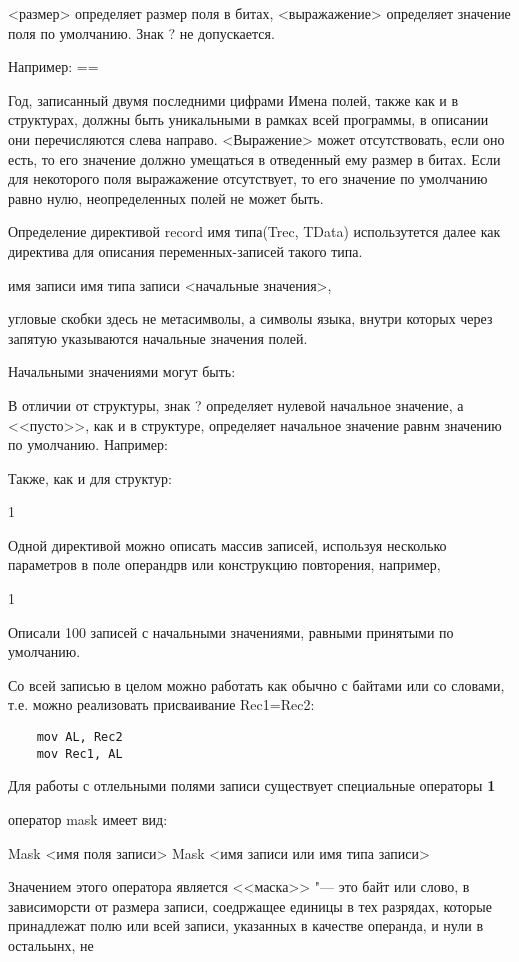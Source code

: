 <размер> определяет размер поля в битах, <выражажение> определяет значение поля по умолчанию. Знак ? не допускается.

Например:
==

Год, записанный двумя последними цифрами
Имена полей, также как и в структурах, должны быть уникальными в рамках всей программы, в описании они перечисляются слева направо. <Выражение> может отсутствовать, если оно есть, то его значение должно умещаться в отведенный ему размер в битах. Если для некоторого поля выражажение отсутствует, то его значение по умолчанию равно нулю, неопределенных полей не может быть.

Определение директивой record имя типа(Trec, TData) использутется далее как директива для описания переменных-записей такого типа.
\begin{center}
    имя записи имя типа записи <начальные значения>,
\end{center}
угловые скобки здесь не метасимволы, а символы языка, внутри которых через запятую указываются начальные значения полей.

Начальными значениями могут быть:

В отличии от структуры, знак ? определяет нулевой начальное значение, а <<пусто>>, как и в структуре, определяет начальное значение равнм значению по умолчанию. Например:

Также, как и для структур:
\begin{center}
    1
\end{center}
Одной директивой можно описать массив записей, используя несколько параметров в поле операндрв или конструкцию повторения, например, 
\begin{center}
    1
\end{center}
Описали 100 записей с начальными значениями, равными принятыми по умолчанию.

Со всей записью в целом можно работать как обычно с байтами или со словами, т.е. можно реализовать присваивание Rec1=Rec2:
\begin{verbatim}
    mov AL, Rec2
    mov Rec1, AL
\end{verbatim}
Для работы с отлельными полями записи существует специальные операторы \textbf{1}

оператор mask имеет вид:
\begin{center}
    Mask <имя поля записи>
    Mask <имя записи или имя типа записи>
\end{center}
Значением этого оператора является <<маска>> "--- это байт или слово, в зависиморсти от размера записи, соедржащее единицы в тех разрядах, которые принадлежат полю или всей записи, указанных в качестве операнда, и нули в остальынх, не

